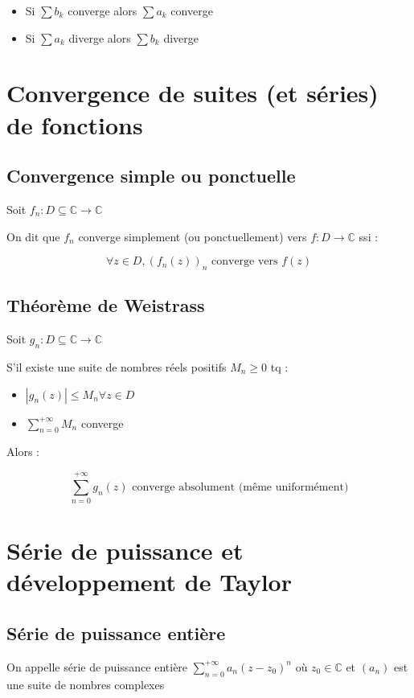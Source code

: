 \documentclass[a4paper,10pt]{report}
\newcommand{\ap}{\rightarrow}
\newcommand{\C}{\mathbb{C}}
\newcommand{\abs}[1]{\left\vert #1 \right\vert}
\begin{document}
\begin{itemize}
\item{Si $\sum b_k$ converge alors $\sum a_k$ converge}
\item{Si $\sum a_k$ diverge alors $\sum b_k$ diverge}
\end{itemize}

\section{Convergence de suites (et séries) de fonctions}

\subsection{Convergence simple ou ponctuelle}

Soit $f_n : D \subseteq \C \ap \C$

On dit que $f_n$ converge simplement (ou ponctuellement) vers $f : D \ap \C$ ssi :

\[ \forall z \in D, \left(f_n(z)\right)_n \mbox{ converge vers } f(z) \]

\subsection{Théorème de Weistrass}

Soit $g_n : D \subseteq \C \ap \C$ 

S'il existe une suite de nombres réels positifs $M_n \geq 0$ tq :

\begin{itemize}
\item{$\abs{g_n(z)} \leq M_n \forall z \in D$}
\item{$\sum_{n=0}^{+\infty} M_n$ converge}
\end{itemize}

Alors :

\[\sum_{n=0}^{+\infty} g_n(z) \mbox{ converge absolument (même uniformément)}\]

\section{Série de puissance et développement de Taylor}

\subsection{Série de puissance entière}
On appelle série de puissance entière $\sum_{n=0}^{+\infty} a_n(z-z_0)^n$ où $z_0 \in \C$ et $(a_n)$ est une suite de nombres complexes
\end{document}
